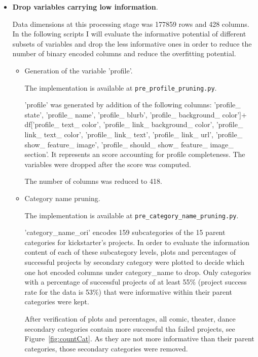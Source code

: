 \documentclass{article}
\begin{document}
\begin{itemize}
    \item \textbf{Drop variables carrying low information}.
    
    Data dimensions at this processing stage was 177859 rows and 428 columns. In the following scripts I will evaluate the informative potential of different subsets of variables and drop the less informative ones in order to reduce the number of binary encoded columns and reduce the overfitting potential.
    
    \begin{itemize}
	\item Generation of the variable 'profile'.
	
        The implementation is available at {\tt pre\_profile\_pruning.py}.
	
	'profile' was generated by addition of the following columns: 'profile\_ state', 'profile\_ name', 'profile\_ blurb', 'profile\_ background\_ color']+ df['profile\_ text\_ color', 'profile\_ link\_ background\_ color', 'profile\_ link\_ text\_ color', 'profile\_ link\_ text', 'profile\_ link\_ url', 'profile\_ show\_ feature\_ image', 'profile\_ should\_ show\_ feature\_ image\_ section'. It represents an score accounting for profile completeness. The variables were dropped after the score was computed.
        
	The number of columns was reduced to 418.
	
	\item Category name pruning.
	
	The implementation is available at {\tt pre\_category\_name\_pruning.py}.
	
	'category\_name\_ori' encodes 159 subcategories of the 15 parent categories for kickstarter's projects. In order to evaluate the information content of each of these subcategory levels, plots and percentages of successful projects by secondary category were plotted to decide which one hot encoded columns under category\_name to drop. Only categories with a percentage of successful projects of at least 55\% (project success rate for the data is 53\%) that were informative within their parent categories were kept.
	
	After verification of plots and percentages, all comic, theater, dance secondary categories contain more successful tha failed projects, see Figure~\ref{fig:countCat}. As they are not more informative than their parent categories, those secondary categories were removed. 
	

\end{itemize}
\end{itemize}
\end{document}
